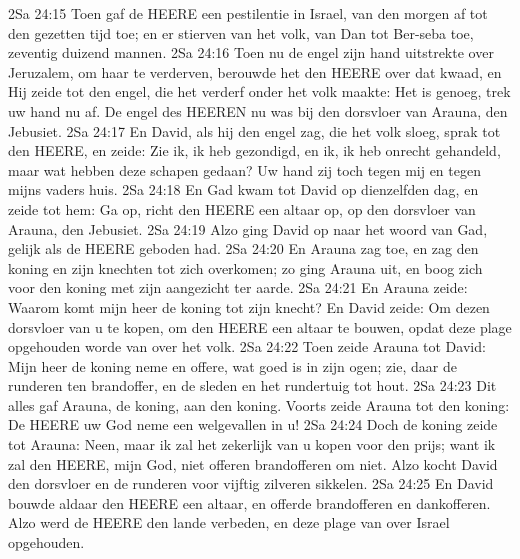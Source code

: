 2Sa 24:15  Toen gaf de HEERE een pestilentie in Israel, van den morgen af tot den gezetten tijd toe; en er stierven van het volk, van Dan tot Ber-seba toe, zeventig duizend mannen.
2Sa 24:16  Toen nu de engel zijn hand uitstrekte over Jeruzalem, om haar te verderven, berouwde het den HEERE over dat kwaad, en Hij zeide tot den engel, die het verderf onder het volk maakte: Het is genoeg, trek uw hand nu af. De engel des HEEREN nu was bij den dorsvloer van Arauna, den Jebusiet.
2Sa 24:17  En David, als hij den engel zag, die het volk sloeg, sprak tot den HEERE, en zeide: Zie ik, ik heb gezondigd, en ik, ik heb onrecht gehandeld, maar wat hebben deze schapen gedaan? Uw hand zij toch tegen mij en tegen mijns vaders huis.
2Sa 24:18  En Gad kwam tot David op dienzelfden dag, en zeide tot hem: Ga op, richt den HEERE een altaar op, op den dorsvloer van Arauna, den Jebusiet.
2Sa 24:19  Alzo ging David op naar het woord van Gad, gelijk als de HEERE geboden had.
2Sa 24:20  En Arauna zag toe, en zag den koning en zijn knechten tot zich overkomen; zo ging Arauna uit, en boog zich voor den koning met zijn aangezicht ter aarde.
2Sa 24:21  En Arauna zeide: Waarom komt mijn heer de koning tot zijn knecht? En David zeide: Om dezen dorsvloer van u te kopen, om den HEERE een altaar te bouwen, opdat deze plage opgehouden worde van over het volk.
2Sa 24:22  Toen zeide Arauna tot David: Mijn heer de koning neme en offere, wat goed is in zijn ogen; zie, daar de runderen ten brandoffer, en de sleden en het rundertuig tot hout.
2Sa 24:23  Dit alles gaf Arauna, de koning, aan den koning. Voorts zeide Arauna tot den koning: De HEERE uw God neme een welgevallen in u!
2Sa 24:24  Doch de koning zeide tot Arauna: Neen, maar ik zal het zekerlijk van u kopen voor den prijs; want ik zal den HEERE, mijn God, niet offeren brandofferen om niet. Alzo kocht David den dorsvloer en de runderen voor vijftig zilveren sikkelen.
2Sa 24:25  En David bouwde aldaar den HEERE een altaar, en offerde brandofferen en dankofferen. Alzo werd de HEERE den lande verbeden, en deze plage van over Israel opgehouden.




